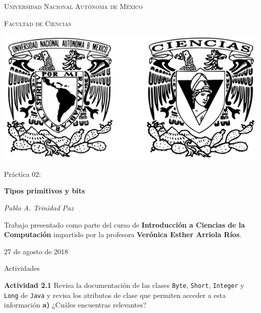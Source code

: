 \documentclass[11pt,letterpaper]{article}
\begin{document}
\begin{titlepage}
    \centering

    {\scshape\LARGE Universidad Nacional Autónoma de México \par}

    \vspace{1cm}
    {\scshape\Large Facultad de Ciencias\par}
    \vspace{1.5cm}

    \begin{center}
        \includegraphics[scale=.1]{../../assets/img/logo.png}
    \end{center}

    \vspace{.8 cm}

    {\LARGE Práctica 02: \par}
    {\huge\bfseries Tipos primitivos y bits \par}

    \vspace{0.5cm}
    {\large\itshape Pablo A. Trinidad Paz\par}

    \vfill

    Trabajo presentado como parte del curso de \textbf{Introducción a Ciencias de la Computación}
    impartido por la profesora \textbf{Verónica Esther Arriola Ríos}. \par
    \vspace{0.1cm}
    {\large 27 de agosto de 2018\par}
\end{titlepage}

{\LARGE Actividades \par}

\textbf{Actividad 2.1} Revisa la documentación de las clases \texttt{Byte},
\texttt{Short}, \texttt{Integer} y \texttt{Long} de \texttt{Java} y revisa
los atributos de clase que permiten acceder a esta información
\textbf{a)} ¿Cuáles encuentras relevantes? \\
\end{document}
